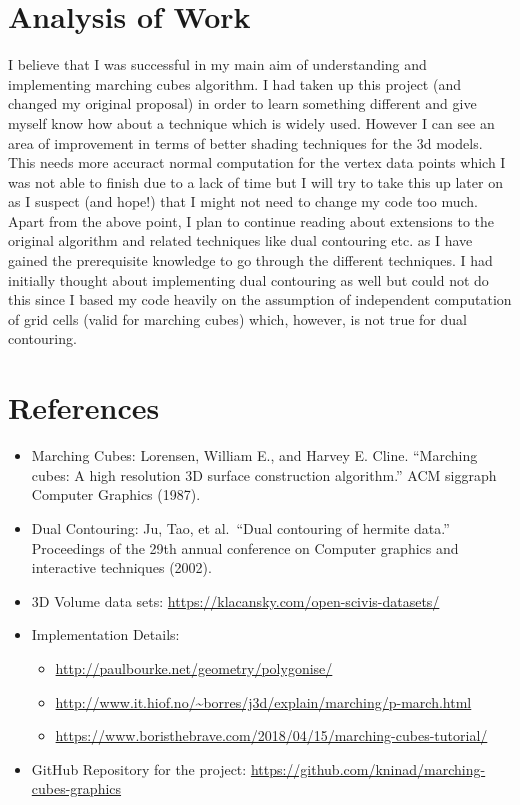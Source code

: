 \hypertarget{analysis-of-work}{%
\section{Analysis of Work}\label{analysis-of-work}}

I believe that I was successful in my main aim of understanding and
implementing marching cubes algorithm. I had taken up this project (and
changed my original proposal) in order to learn something different and
give myself know how about a technique which is widely used. However I
can see an area of improvement in terms of better shading techniques for
the 3d models. This needs more accuract normal computation for the
vertex data points which I was not able to finish due to a lack of time
but I will try to take this up later on as I suspect (and hope!) that I
might not need to change my code too much. Apart from the above point, I
plan to continue reading about extensions to the original algorithm and
related techniques like dual contouring etc. as I have gained the
prerequisite knowledge to go through the different techniques. I had
initially thought about implementing dual contouring as well but could
not do this since I based my code heavily on the assumption of
independent computation of grid cells (valid for marching cubes) which,
however, is not true for dual contouring.

\hypertarget{references}{%
\section{References}\label{references}}

\begin{itemize}
\item
  Marching Cubes: Lorensen, William E., and Harvey E. Cline. ``Marching
  cubes: A high resolution 3D surface construction algorithm.'' ACM
  siggraph Computer Graphics (1987).
\item
  Dual Contouring: Ju, Tao, et al.~``Dual contouring of hermite data.''
  Proceedings of the 29th annual conference on Computer graphics and
  interactive techniques (2002).
\item
  3D Volume data sets: \url{https://klacansky.com/open-scivis-datasets/}
\item
  Implementation Details:

  \begin{itemize}
  \tightlist
  \item
    \url{http://paulbourke.net/geometry/polygonise/}
  \item
    \url{http://www.it.hiof.no/~borres/j3d/explain/marching/p-march.html}
  \item
    \href{https://www.boristhebrave.com/2018/04/15/marching-cubes-tutorial}{https://www.boristhebrave.com/2018/04/15/marching-cubes-tutorial/}
  \end{itemize}
\item
  GitHub Repository for the project:
  \url{https://github.com/kninad/marching-cubes-graphics}
\end{itemize}
